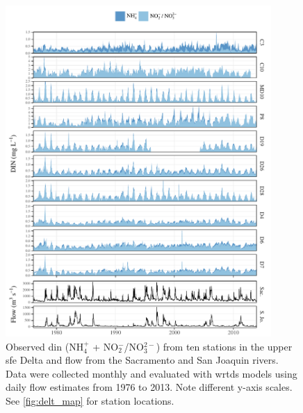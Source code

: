 \documentclass[journal = esthag, manuscript = article]{achemso}\usepackage[]{graphicx}\usepackage[]{color}
\begin{document}
\begin{figure}[!ht]

{\centering \includegraphics[width=0.9\textwidth]{figs/obsdat-1} 

}

\caption{Observed \ac{din} (NH$_4^{+}$ + NO$_2^{-}$/NO$_3^{2-}$) from ten stations in the upper \ac{sfe} Delta and flow from the Sacramento and San Joaquin rivers.  Data were collected monthly and evaluated with \ac{wrtds} models using daily flow estimates from 1976 to 2013. Note different y-axis scales.  See \cref{fig:delt_map} for station locations.}\label{fig:obsdat}
\end{figure}
\end{document}
